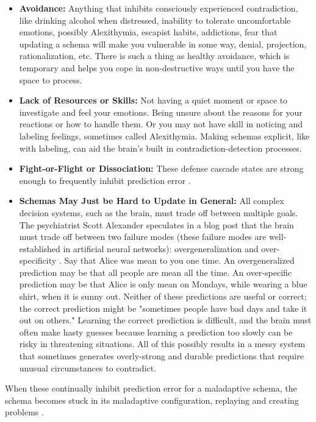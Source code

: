 \documentclass[12pt,letterpaper]{book}
\begin{document}
\begin{itemize}
    \item \textbf{Avoidance:} Anything that inhibits consciously experienced contradiction, like drinking alcohol when distressed, inability to tolerate uncomfortable emotions, possibly Alexithymia, escapist habits, addictions, fear that updating a schema will make you vulnerable in some way, denial, projection, rationalization, etc. There is such a thing as healthy avoidance, which is temporary and helps you cope in non-destructive ways until you have the space to process.
    \item \textbf{Lack of Resources or Skills:} Not having a quiet moment or space to investigate and feel your emotions. Being unsure about the reasons for your reactions or how to handle them. Or you may not have skill in noticing and labeling feelings, sometimes called Alexithymia. Making schemas explicit, like with labeling, can aid the brain's built in contradiction-detection processes.
    \item \textbf{Fight-or-Flight or Dissociation:} These defense cascade states are strong enough to frequently inhibit prediction error \cite{razviPSIP}.
    \item \textbf{Schemas May Just be Hard to Update in General:} All complex decision systems, such as the brain, must trade off between multiple goals. The psychiatrist Scott Alexander speculates in a blog post that the brain must trade off between two failure modes (these failure modes are well-established in artificial neural networks): overgeneralization and over-specificity \cite{alexanderMountains}. Say that Alice was mean to you one time. An overgeneralized prediction may be that all people are mean all the time. An over-specific prediction may be that Alice is only mean on Mondays, while wearing a blue shirt, when it is sunny out. Neither of these predictions are useful or correct; the correct prediction might be "sometimes people have bad days and take it out on others." Learning the correct prediction is difficult, and the brain must often make hasty guesses because learning a prediction too slowly can be risky in threatening situations. All of this possibly results in a messy system that sometimes generates overly-strong and durable predictions that require unusual circumstances to contradict.
\end{itemize}
\label{def:schemas} When these continually inhibit prediction error for a maladaptive schema, the schema becomes stuck in its maladaptive configuration, replaying and creating problems \cite{rachmanProcessing,eckerUnlocking}.
\end{document}
